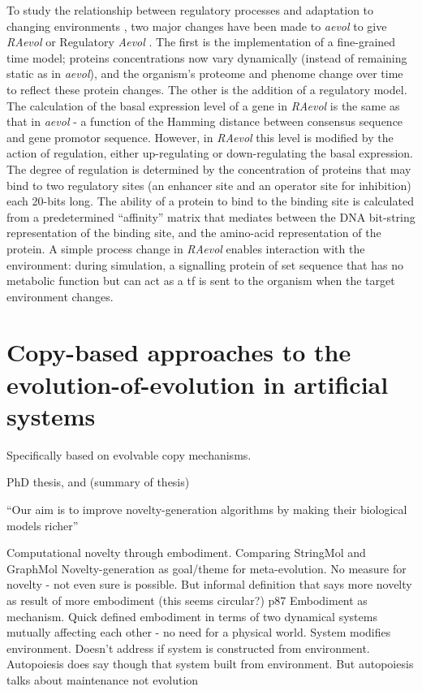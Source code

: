 To study the relationship between regulatory processes and adaptation to changing environments \parencite{Sanchez-Dehesa:2008uq}, two major changes have been made to \emph{aevol} to give \emph{RAevol} or Regulatory \emph{Aevol} \parencite{Beslon:2010zr,Sanchez-Dehesa:2008uq}. The first is the implementation of a fine-grained time model; proteins concentrations now vary dynamically (instead of remaining static as in \emph{aevol}), and the organism's proteome and phenome change over time to reflect these protein changes. The other is the addition of a regulatory model. The calculation of the basal expression level of a gene in \emph{RAevol} is the same as that in \emph{aevol} - a function of the Hamming distance between consensus sequence and gene promotor sequence. However, in \emph{RAevol} this level is modified by the action of regulation, either up-regulating or down-regulating the basal expression. The degree of regulation is determined by the concentration of proteins that may bind to two regulatory sites (an enhancer site and an operator site for inhibition) each 20-bits long. The ability of a protein to bind to the binding site is calculated from a predetermined ``affinity'' matrix that mediates between the DNA bit-string representation of the binding site, and the amino-acid representation of the protein. A simple process change in \emph{RAevol} enables interaction with the environment:  during simulation, a signalling protein of set sequence that has no metabolic function but can act as a \gls{tf} is sent to the organism when the target environment changes.

\section{Copy-based approaches to the evolution-of-evolution in artificial systems}

Specifically based on evolvable copy mechanisms.

\parencite{Nellis2012} PhD thesis, and \parencite{Nellis2014} (summary of thesis)

``Our aim is to improve novelty-generation algorithms by making their biological models richer''

Computational novelty through embodiment. Comparing StringMol and GraphMol
Novelty-generation as goal/theme for meta-evolution. No measure for novelty - not even sure is possible. But informal definition that says more novelty as result of more embodiment (this seems circular?) p87 Embodiment as mechanism. 
Quick defined embodiment in terms of two dynamical systems mutually affecting each other - no need for a physical world. System modifies environment. Doesn't address if system is constructed from environment. Autopoiesis does say though that system built from environment. But autopoiesis talks about maintenance not evolution

